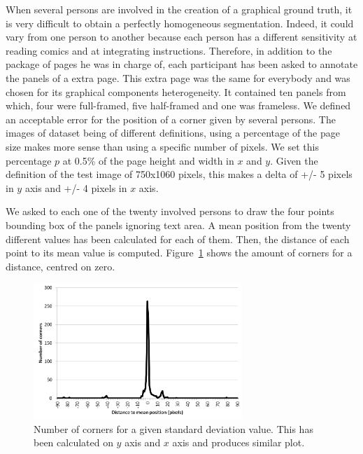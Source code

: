 When several persons are involved in the creation of a graphical ground truth, it is very difficult to obtain a perfectly homogeneous segmentation.
Indeed, it could vary from one person to another because each person has a different sensitivity at reading comics and at integrating instructions.
Therefore, in addition to the package of pages he was in charge of, each participant has been asked to annotate the panels of a extra page. 
This extra page was the same for everybody and was chosen for its graphical components heterogeneity. 
It contained ten panels from which, four were full-framed, five half-framed and one was frameless.
We defined an acceptable error for the position of a corner given by several persons.
The images of dataset being of different definitions, using a percentage of the page size makes more sense than using a specific number of pixels.
We set this percentage $p$ at 0.5\% of the page height and width in $x$ and $y$. 
Given the definition of the test image of 750x1060 pixels, this makes a delta of +/- 5 pixels in $y$ axis and +/- 4 pixels in $x$ axis. 

We asked to each one of the twenty involved persons to draw the four points bounding box of the panels ignoring text area.
A mean position from the twenty different values has been calculated for each of them.
Then, the distance of each point to its mean value is computed. 
Figure~\ref{fig:gt:graphiqueStdVT} shows the amount of corners for a distance, centred on zero.


\begin{figure}[h!]
\begin{center}
\includegraphics[width=0.7\textwidth]{stdVT.png}
\caption[Distance to the mean position]{Number of corners for a given standard deviation value. This has been calculated on $y$ axis and $x$ axis and produces similar plot.}
\label{fig:gt:graphiqueStdVT}
\end{center}
\end{figure}

